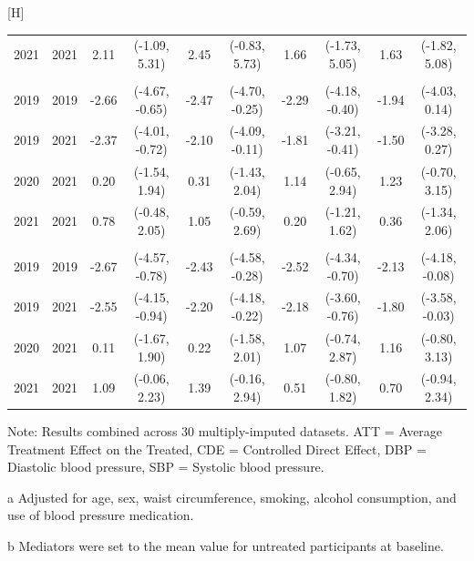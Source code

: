 \documentclass[
  letterpaper,
  DIV=11,
  numbers=noendperiod]{scrartcl}
\makeatletter
\renewenvironment{table}%
   {\renewcommand\familydefault\sfdefault
    \@float{table}}
   {\end@float}
\makeatother
\begin{document}
\begin{table}[H]
\begin{threeparttable}
\begin{tabular}{llcccccccc}
\hspace{1em}2021 & 2021 & 2.11 & (-1.09, 5.31) & 2.45 & (-0.83, 5.73) & 1.66 & (-1.73, 5.05) & 1.63 & (-1.82, 5.08)\\
\addlinespace[0.3em]
\multicolumn{10}{l}{\textbf{Brachial DBP}}\\
\hspace{1em}2019 & 2019 & -2.66 & (-4.67, -0.65) & -2.47 & (-4.70, -0.25) & -2.29 & (-4.18, -0.40) & -1.94 & (-4.03, 0.14)\\
\hspace{1em}2019 & 2021 & -2.37 & (-4.01, -0.72) & -2.10 & (-4.09, -0.11) & -1.81 & (-3.21, -0.41) & -1.50 & (-3.28, 0.27)\\
\hspace{1em}2020 & 2021 & 0.20 & (-1.54, 1.94) & 0.31 & (-1.43, 2.04) & 1.14 & (-0.65, 2.94) & 1.23 & (-0.70, 3.15)\\
\hspace{1em}2021 & 2021 & 0.78 & (-0.48, 2.05) & 1.05 & (-0.59, 2.69) & 0.20 & (-1.21, 1.62) & 0.36 & (-1.34, 2.06)\\
\addlinespace[0.3em]
\multicolumn{10}{l}{\textbf{Central DBP}}\\
\hspace{1em}2019 & 2019 & -2.67 & (-4.57, -0.78) & -2.43 & (-4.58, -0.28) & -2.52 & (-4.34, -0.70) & -2.13 & (-4.18, -0.08)\\
\hspace{1em}2019 & 2021 & -2.55 & (-4.15, -0.94) & -2.20 & (-4.18, -0.22) & -2.18 & (-3.60, -0.76) & -1.80 & (-3.58, -0.03)\\
\hspace{1em}2020 & 2021 & 0.11 & (-1.67, 1.90) & 0.22 & (-1.58, 2.01) & 1.07 & (-0.74, 2.87) & 1.16 & (-0.80, 3.13)\\
\hspace{1em}2021 & 2021 & 1.09 & (-0.06, 2.23) & 1.39 & (-0.16, 2.94) & 0.51 & (-0.80, 1.82) & 0.70 & (-0.94, 2.34)\\
\bottomrule
\end{tabular}
\begin{tablenotes}
\item \small{Note: Results combined across 30 multiply-imputed datasets. ATT = Average Treatment Effect on the Treated, CDE = Controlled Direct Effect, DBP = Diastolic blood pressure, SBP = Systolic blood pressure.}
\item[a] \small{Adjusted for age, sex, waist circumference, smoking, alcohol consumption, and use of blood pressure medication.}
\item[b] \small{Mediators were set to the mean value for untreated participants at baseline.}
\end{tablenotes}
\end{threeparttable}
\endgroup{}
\end{table}
\end{document}
